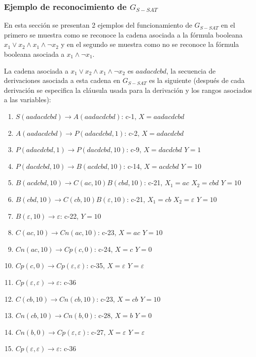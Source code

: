 \subsubsection{Ejemplo de reconocimiento de $G_{S-SAT}$}

En esta sección se presentan 2 ejemplos del funcionamiento de $G_{S-SAT}$ en el primero se muestra como se reconoce
la cadena asociada a la fórmula booleana $x_1 \vee  x_2 \wedge x_1 \wedge \neg x_2$ y en el segundo se muestra como no
se reconoce la fórmula booleana asociada a $x_1 \wedge \neg x_1$.

La cadena asociada a $x_1 \vee  x_2 \wedge x_1 \wedge \neg x_2$ es $aadacdcbd$, la secuencia de derivaciones asociada
a esta cadena en $G_{S-SAT}$ es la siguiente  (después de
cada derivación se especifica la cláusula usada para la derivación y los rangos
asociados a las variables):

\begin{enumerate}
    \item $S(aadacdcbd)\to A(aadacdcbd)$: c-1, $X=aadacdcbd$
    \item $A(aadacdcbd)\to P(adacdcbd,1)$: c-2, $X=adacdcbd$
    \item $P(adacdcbd,1)\to P(dacdcbd,10)$: c-9, $X=dacdcbd$ $Y=1$
    \item $P(dacdcbd,10)\to B(acdcbd, 10)$: c-14, $X=acdcbd$ $Y=10$
    \item $B(acdcbd, 10)\to C(ac,10) B(cbd,10)$: c-21, $X_1=ac$ $X_2=cbd$ $Y=10$
    \item $B(cbd,10)\to C(cb,10) B(\varepsilon,10)$: c-21, $X_1=cb$ $X_2=\varepsilon$ $Y=10$
    \item $B(\varepsilon,10)\to \varepsilon$: c-22, $Y=10$
    \item $C(ac,10)\to Cn(ac,10)$: c-23, $X=ac$ $Y=10$
    \item $Cn(ac,10)\to Cp(c,0)$: c-24, $X=c$ $Y=0$
    \item $Cp(c,0)\to Cp(\varepsilon,\varepsilon)$: c-35, $X=\varepsilon$ $Y=\varepsilon$
    \item $Cp(\varepsilon, \varepsilon) \to \varepsilon$: c-36
    \item $C(cb,10)\to Cn(cb,10)$: c-23, $X=cb$ $Y=10$
    \item $Cn(cb,10)\to Cn(b,0)$: c-28, $X=b$ $Y=0$
    \item $Cn(b,0)\to Cp(\varepsilon,\varepsilon)$: c-27, $X=\varepsilon$ $Y=\varepsilon$
    \item $Cp(\varepsilon, \varepsilon) \to \varepsilon$: c-36
\end{enumerate}

